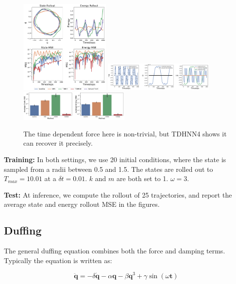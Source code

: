\documentclass[twoside]{article}
\begin{document}
\begin{figure}[h!]
\centering
\includegraphics[width=0.4\textwidth]{figures/forced_mass_spring_2.pdf}
\includegraphics[width=0.49\textwidth]{figures/dpdt_forced_mass_spring_2.pdf}
\includegraphics[width=0.49\textwidth]{figures/mass_spring_forced_2_errors.pdf}
\caption{The time dependent force here is non-trivial, but TDHNN4 shows it can recover it precisely.}
\end{figure}

\textbf{Training:} In both settings, we use 20 initial conditions, where the state is sampled from a radii between 0.5 and 1.5. The states are rolled out to $T_{max}=10.01$ at a $\delta t = 0.01$. $k$ and $m$ are both set to 1. $\omega =3$. 

\textbf{Test:} At inference, we compute the rollout of 25 trajectories, and report the average state and energy rollout MSE in the figures.

\subsection{Duffing}

The general duffing equation combines both the force and damping terms. Typically the equation is written as:

\begin{equation}
\ddot{\mathbf{q}} = -\delta \dot{\mathbf{q}} -\alpha \mathbf{q} -\beta \mathbf{q}^3 +\gamma \sin(\omega \mathbf{t}) 
\end{equation}
\end{document}
